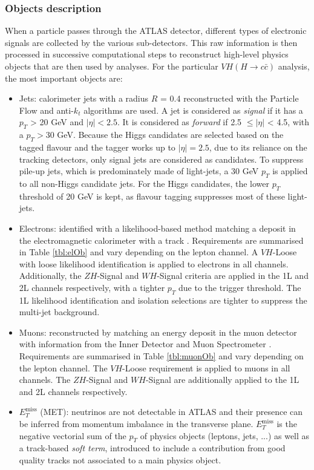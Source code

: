\subsubsection{Objects description}
When a particle passes through the ATLAS detector, different types of electronic signals are collected by the various sub-detectors. This raw information is then processed in successive computational steps to reconstruct high-level physics objects that are then used by analyses. For the particular $VH (H\rightarrow c\bar{c})$ analysis, the most important objects are:
\begin{itemize}
\item Jets: calorimeter jets with a radius $R$ = 0.4 reconstructed with the Particle Flow and anti-$k_t$ algorithms \cite{Cacciari:2008gp} are used. A jet is considered as \textit{signal} if it has a $p_T$ > 20 GeV and $|\eta| < 2.5$. It is considered as \textit{forward} if 2.5 $\leq |\eta|$ < 4.5, with a $p_T > 30$ GeV. Because the Higgs candidates are selected based on the tagged flavour and the tagger works up to $|\eta| = 2.5$, due to its reliance on the tracking detectors, only signal jets are considered as candidates. To suppress pile-up jets, which is predominately made of light-jets, a 30 GeV $p_T$ is applied to all non-Higgs candidate jets. For the Higgs candidates, the lower $p_T$ threshold of 20 GeV is kept, as flavour tagging suppresses most of these light-jets. 
\item Electrons: identified with a likelihood-based method matching a deposit in the electromagnetic calorimeter with a track \cite{Aaboud:2657964}. Requirements are summarised in Table \ref{tbl:elOb} and vary depending on the lepton channel. A $VH$-Loose with loose likelihood identification is applied to electrons in all channels. Additionally, the $ZH$-Signal and $WH$-Signal criteria are applied in the 1L and 2L channels respectively, with a tighter $p_T$ due to the trigger threshold. The 1L likelihood identification and isolation selections are tighter to suppress the multi-jet background.
\item Muons: reconstructed by matching an energy deposit in the muon detector with information from the Inner Detector and Muon Spectrometer \cite{Aad:2746302}. Requirements are summarised in Table \ref{tbl:muonOb} and vary depending on the lepton channel. The $VH$-Loose requirement is applied to muons in all channels. The $ZH$-Signal and $WH$-Signal are additionally applied to the 1L and 2L channels respectively. 
\item $E_T^{\textrm{miss}}$ (MET): neutrinos are not detectable in ATLAS and their presence can be inferred from momentum imbalance in the transverse plane. $E_T^{\textrm{miss}}$ is the negative vectorial sum of the $p_T$ of physics objects (leptons, jets, ...) as well as a track-based \textit{soft term}, introduced to include a contribution from good quality tracks not associated to a main physics object.

\end{itemize}
